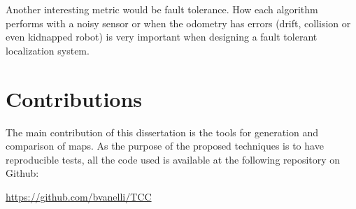 Another interesting metric would be fault tolerance. How each algorithm performs with a noisy sensor or when the odometry has errors (drift, collision or even kidnapped robot) is very important when designing a fault tolerant localization system.

\section{Contributions}

The main contribution of this dissertation is the tools for generation and comparison of maps. As the purpose of the proposed techniques is to have reproducible tests, all the code used is available at the following repository on Github: 

\url{https://github.com/bvanelli/TCC}

